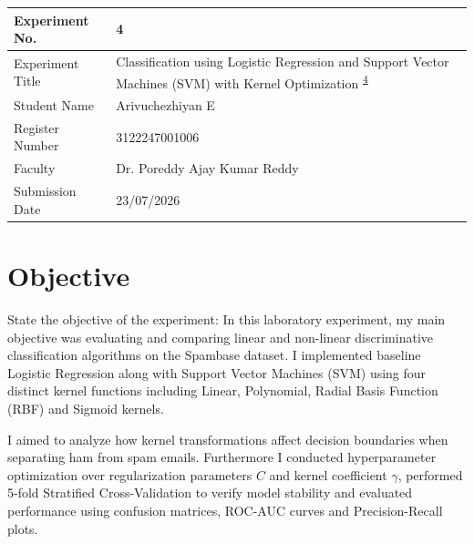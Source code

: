 \documentclass[12pt,a4paper]{article}
\begin{document}

\begin{tabular}{|p{4cm}|p{11cm}|}
\hline
Experiment No. & 4 \\ \hline
Experiment Title & Classification using Logistic Regression and Support Vector Machines (SVM) with Kernel Optimization \textsuperscript{\href{https://github.com/arivuchezhiyan/Machine_Learning/tree/main/experiment_4}{4}} \\ \hline
Student Name & Arivuchezhiyan E \\ \hline
Register Number & 3122247001006 \\ \hline
Faculty & Dr. Poreddy Ajay Kumar Reddy \\ \hline
Submission Date & 23/07/2026 \\ \hline
\end{tabular}

\section{Objective}
State the objective of the experiment:
In this laboratory experiment, my main objective was evaluating and comparing linear and non-linear discriminative classification algorithms on the Spambase dataset. I implemented baseline Logistic Regression along with Support Vector Machines (SVM) using four distinct kernel functions including Linear, Polynomial, Radial Basis Function (RBF) and Sigmoid kernels. 

I aimed to analyze how kernel transformations affect decision boundaries when separating ham from spam emails. Furthermore I conducted hyperparameter optimization over regularization parameters $C$ and kernel coefficient $\gamma$, performed 5-fold Stratified Cross-Validation to verify model stability and evaluated performance using confusion matrices, ROC-AUC curves and Precision-Recall plots.
\end{document}

